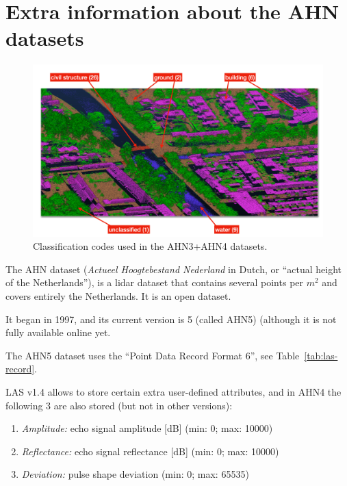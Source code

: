 
\graphicspath{{appendices/ahn/figs/}}

\chapter{Extra information about the AHN datasets}%
\label{app:ahn}


\begin{figure}
  \includegraphics[width=\linewidth]{ahn4.png}
  \caption{Classification codes used in the AHN3+AHN4 datasets.}%
\label{fig:ahn3}
\end{figure}

The AHN dataset (\emph{Actueel Hoogtebestand Nederland} in Dutch, or ``actual height of the Netherlands''), 
is a lidar dataset that contains several points per $m^2$ and covers entirely the Netherlands.
It is an open dataset.

It began in 1997, and its current version is 5 (called AHN5) (although it is not fully available online yet.

The AHN5 dataset uses the ``Point Data Record Format 6'', see Table~\ref{tab:las-record}.

LAS v1.4 allows to store certain extra user-defined attributes, and in AHN4 the following 3 are also stored (but not in other versions):
\begin{enumerate}
  \item \emph{Amplitude:} echo signal amplitude [dB] (min: 0; max: 10000) 
  \item \emph{Reflectance:} echo signal reflectance [dB] (min: 0; max: 10000)
  \item \emph{Deviation:} pulse shape deviation (min: 0; max: 65535)
\end{enumerate}

